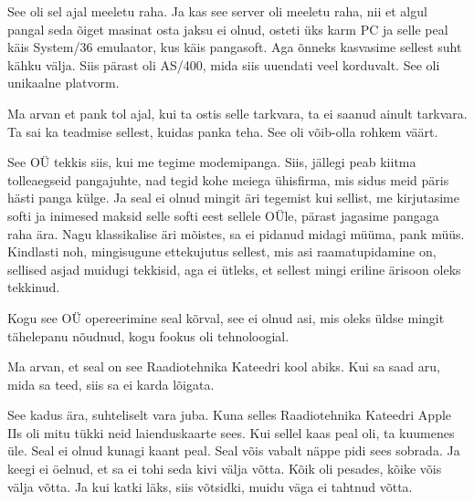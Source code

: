 See oli sel ajal meeletu raha.  Ja kas see server oli meeletu raha, nii et 
algul pangal seda õiget masinat osta jaksu ei olnud, osteti üks karm 
PC ja selle peal käis System/36 emulaator, kus käis 
pangasoft. Aga õnneks kasvasime sellest suht kähku välja. Siis pärast oli 
AS/400, mida siis uuendati veel korduvalt. See oli 
unikaalne platvorm.

Ma arvan et pank tol ajal, kui ta ostis selle tarkvara, ta ei saanud ainult 
tarkvara. Ta sai ka teadmise sellest, kuidas panka teha. See oli võib-olla 
rohkem väärt.


See OÜ tekkis siis, kui me tegime modemipanga. Siis, jällegi peab kiitma 
tolleaegseid pangajuhte, nad tegid kohe meiega ühisfirma,  mis sidus meid päris 
hästi panga külge. Ja seal ei olnud mingit äri tegemist kui sellist, me 
kirjutasime softi ja inimesed maksid selle softi eest sellele OÜle, pärast 
jagasime pangaga raha ära. Nagu klassikalise äri mõistes, sa ei pidanud midagi 
müüma, pank müüs. Kindlasti noh, mingisugune ettekujutus sellest, mis asi 
raamatupidamine on,  sellised asjad muidugi tekkisid, aga  ei ütleks, et 
sellest mingi eriline ärisoon oleks tekkinud.

Kogu see OÜ  opereerimine seal kõrval,  see  ei olnud asi, mis oleks üldse 
mingit tähelepanu nõudnud, kogu fookus oli tehnoloogial.


Ma arvan, et seal on see Raadiotehnika Kateedri kool abiks. Kui sa saad aru, 
mida sa teed, siis sa ei karda lõigata.


See kadus ära, suhteliselt vara juba. Kuna selles Raadiotehnika Kateedri Apple 
IIs oli mitu tükki neid laienduskaarte sees. Kui sellel 
kaas peal oli, ta  kuumenes üle. Seal ei olnud kunagi kaant peal. Seal võis 
vabalt näppe pidi sees sobrada. Ja keegi  ei öelnud, et sa ei tohi seda kivi 
välja võtta. Kõik oli pesades, kõike võis välja võtta.  Ja kui katki läks, siis 
võtsidki, muidu väga ei tahtnud võtta. 


